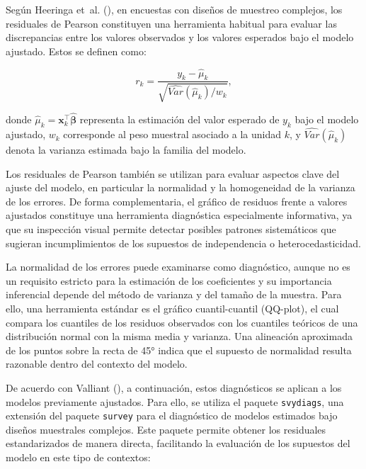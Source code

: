 \documentclass[
  spanish,
  11pt,
  letterpaper,
  oneside,
  open=any]{scrbook}
\newenvironment{Shaded}{\begin{snugshade}}{\end{snugshade}}
\newcommand{\FunctionTok}[1]{\textcolor[rgb]{0.28,0.35,0.67}{#1}}
\newcommand{\NormalTok}[1]{\textcolor[rgb]{0.00,0.23,0.31}{#1}}
\newcommand{\OtherTok}[1]{\textcolor[rgb]{0.00,0.23,0.31}{#1}}
\newcommand{\SpecialCharTok}[1]{\textcolor[rgb]{0.37,0.37,0.37}{#1}}
\begin{document}
Según Heeringa et~al. (),
en encuestas con diseños de muestreo complejos, los residuales de
Pearson constituyen una herramienta habitual para evaluar las
discrepancias entre los valores observados y los valores esperados bajo
el modelo ajustado. Estos se definen como:

\[
r_{k} = \frac{y_k - \hat\mu_k}{\sqrt{\widehat{Var}(\hat\mu_k)/w_k}},
\]

donde \(\hat{\mu}_{k} = \mathbf{x}_{k}^{\top}\hat{\boldsymbol{\beta}}\)
representa la estimación del valor esperado de \(y_{k}\) bajo el modelo
ajustado, \(w_{k}\) corresponde al peso muestral asociado a la unidad
\(k\), y \(\widehat{Var}(\hat{\mu}_{k})\) denota la varianza estimada
bajo la familia del modelo.

Los residuales de Pearson también se utilizan para evaluar aspectos
clave del ajuste del modelo, en particular la normalidad y la
homogeneidad de la varianza de los errores. De forma complementaria, el
gráfico de residuos frente a valores ajustados constituye una
herramienta diagnóstica especialmente informativa, ya que su inspección
visual permite detectar posibles patrones sistemáticos que sugieran
incumplimientos de los supuestos de independencia o heterocedasticidad.

La normalidad de los errores puede examinarse como diagnóstico, aunque
no es un requisito estricto para la estimación de los coeficientes y su
importancia inferencial depende del método de varianza y del tamaño de
la muestra. Para ello, una herramienta estándar es el gráfico
cuantil-cuantil (QQ-plot), el cual compara los cuantiles de los residuos
observados con los cuantiles teóricos de una distribución normal con la
misma media y varianza. Una alineación aproximada de los puntos sobre la
recta de 45° indica que el supuesto de normalidad resulta razonable
dentro del contexto del modelo.

De acuerdo con Valliant (), a
continuación, estos diagnósticos se aplican a los modelos previamente
ajustados. Para ello, se utiliza el paquete \texttt{svydiags}, una
extensión del paquete \texttt{survey} para el diagnóstico de modelos
estimados bajo diseños muestrales complejos. Este paquete permite
obtener los residuales estandarizados de manera directa, facilitando la
evaluación de los supuestos del modelo en este tipo de contextos:

\begin{Shaded}
\end{Shaded}
\end{document}

